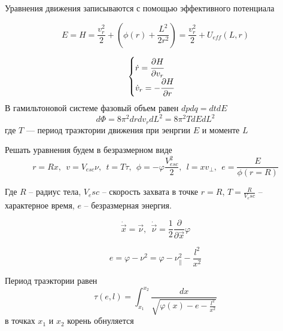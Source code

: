 Уравнения движения записываются с помощью эффективного потенциала

\begin{equation}
\label{eq:move_hamiltonian}	
E = H = \frac{v_{r}^{2}}{2} + \left( {\phi(r) + \frac{L^{2}}{2r^{2}}} \right) = \frac{v_{r}^{2}}{2} + U_{eff}(L,r)
\end{equation}

\begin{equation}
\label{eq:move_equations}
\begin{cases}
\dot{r} = \cfrac{\partial H}{\partial v_r}\\
\dot{v}_r= -\cfrac{\partial H}{\partial r}
\end{cases}
\end{equation}
В гамильтоновой системе фазовый объем равен $dpdq = dtdE$
\begin{equation}
	\label{eq:phase_volume_EL}
	d\Phi = 8\pi^{2}drdv_{r}dL^{2} = 8\pi^{2}TdEdL^2
\end{equation}
где $T$ --- период траэктории движения при эенргии $E$ и моменте $L$ 

Решать уравнения будем в безразмерном виде
\begin{equation}
	\label{eq:undim}
	r = Rx,~~v = V_{esc}\nu,~~t = T\tau,~~\phi= -\varphi\frac{V_{esc}^{2}}{2},~~l = xv_{\perp},~~e = \frac{E}{\phi(r = R)}
\end{equation}

Где $R$ – радиус тела, $V_esc$ – скорость захвата в точке $r = R$, $T=\frac{R}{V_esc}$  – характерное время, $e$ – безразмерная энергия.

\begin{equation}
	\label{eq:move_equation_undim}
	\dot{\vec{x}} = \vec{\nu},~~\dot{\vec{\nu}} =  \frac{1}{2}\frac{\partial}{\partial\vec{x}}\varphi
\end{equation}

\begin{equation}
	\label{eq:energy_undim}
e = \varphi - \nu^{2} = \varphi - \nu_{\parallel}^{2} - \frac{l^{2}}{x^{2}} 
\end{equation}

Период траэктории равен
\begin{equation}
\tau\left( {e,l} \right) = {\int_{x_{1}}^{x_{2}}\frac{dx}{ \sqrt{\varphi(x) -e - \frac{l^{2}}{x^{2}}}}}
\end{equation}
в точках $x_1$ и $x_2$ корень обнуляется

